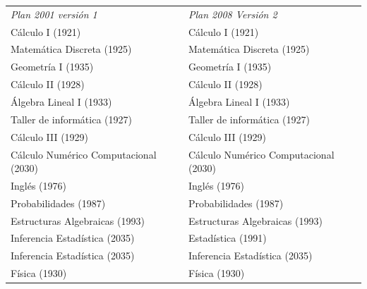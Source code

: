 \documentclass[a4paper, 12pt]{article}
\begin{document}
\begin{center}
\begin{tabular}{|l|l|}\hline
  \rowcolor[gray]{.9}
  \multicolumn{2}{|c|}{\textbf{Equivalencias}}\\\hline

\emph{
Plan 2001 versión 1}    & \emph{Plan 2008 Versión 2 }     \\
\hline


Cálculo I       (1921)               &Cálculo I    (1921)      \\   \hline

Matemática Discreta   (1925)          &Matemática Discreta (1925) \\ \hline

Geometría I        (1935)             & Geometría I (1935)   \\ \hline

Cálculo II         (1928)             & Cálculo II (1928)  \\ \hline

Álgebra Lineal I      (1933)          & Álgebra Lineal I  (1933)  \\ \hline

Taller de informática  (1927)        &Taller de informática (1927) \\ \hline

Cálculo III        (1929)             & Cálculo III (1929)  \\ \hline

Cálculo Numérico  Computacional (2030) &Cálculo Numérico Computacional (2030) 
\\ \hline

Inglés       (1976)            &    Inglés (1976) 
\\ \hline

Probabilidades  (1987)      &Probabilidades    (1987)      \\ \hline

Estructuras Algebraicas (1993)    & Estructuras Algebraicas (1993)  \\ \hline

Inferencia Estadística  (2035)   &Estadística     (1991)        \\ \hline

Inferencia Estadística  (2035)   &Inferencia Estadística  (2035)       \\ \hline

Física          (1930)                & Física    (1930)             \\ \hline


\end{tabular}
\end{center}
\end{document}
